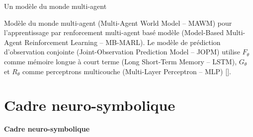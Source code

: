 \documentclass[aspectratio=169]{beamer}
\newcommand{\scite}[1]{{\normalfont\color{SpaceCyan!60!black}[\citealp{#1}]}}
\newcommand{\SectionTransitionFrame}[1]{%
  \begin{frame}[plain]
    \centering
    \vfill
    {\Huge\bfseries #1\par}
    \vfill
  \end{frame}
}
\begin{document}
\begin{frame}{Un modèle du monde multi-agent}
{
  }

  \vspace{0.4cm}

  \begin{block}{}
    \tiny
    Modèle du monde multi-agent (Multi-Agent World Model -- MAWM)
    pour l'apprentissage par renforcement multi-agent basé modèle
    (Model-Based Multi-Agent Reinforcement Learning -- MB-MARL).
    Le modèle de prédiction d'observation conjointe
    (Joint-Observation Prediction Model -- JOPM) utilise $F_\theta$ comme mémoire
    longue à court terme (Long Short-Term Memory -- LSTM), $G_\theta$ et $R_\theta$ comme
    perceptrons multicouche (Multi-Layer Perceptron -- MLP)
    \scite{ha2018worldmodels,hafner2020dreamer}.
  \end{block}

\end{frame}

\section{Cadre neuro-symbolique}

\SectionTransitionFrame{Cadre neuro-symbolique}
\end{document}
